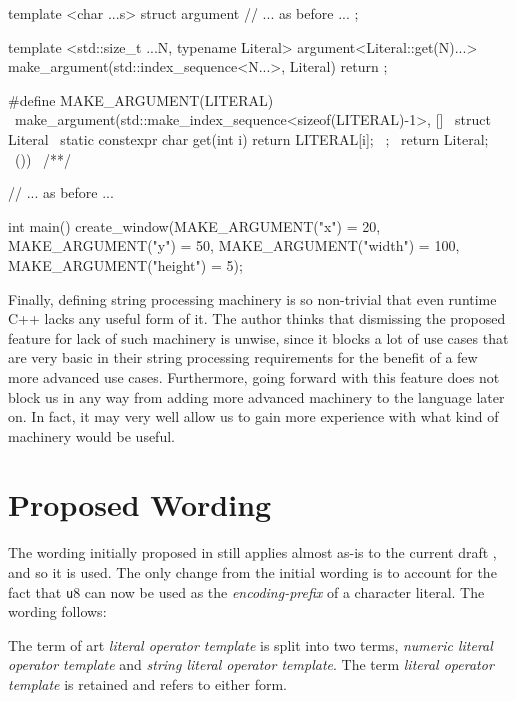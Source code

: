 \documentclass[11pt]{article}
\newcommand{\cc}[1]{\texttt{#1}}
\begin{document}
\begin{cpp}
template <char ...s>
struct argument {
  // ... as before ...
};

template <std::size_t ...N, typename Literal>
argument<Literal::get(N)...> make_argument(std::index_sequence<N...>, Literal) {
  return {};
}

#define MAKE_ARGUMENT(LITERAL)                                              \
  make_argument(std::make_index_sequence<sizeof(LITERAL)-1>{}, []{          \
    struct Literal {                                                        \
      static constexpr char get(int i) { return LITERAL[i]; }               \
    };                                                                      \
    return Literal{};                                                       \
  }())                                                                      \
/**/

// ... as before ...

int main() {
  create_window(MAKE_ARGUMENT("x") = 20, MAKE_ARGUMENT("y") = 50,
                MAKE_ARGUMENT("width") = 100, MAKE_ARGUMENT("height") = 5);
}
\end{cpp}

Finally, defining string processing machinery is so non-trivial that even
runtime C++ lacks any useful form of it. The author thinks that dismissing
the proposed feature for lack of such machinery is unwise, since it blocks
a lot of use cases that are very basic in their string processing requirements
for the benefit of a few more advanced use cases. Furthermore, going forward
with this feature does not block us in any way from adding more advanced
machinery to the language later on. In fact, it may very well allow us to
gain more experience with what kind of machinery would be useful.


\section{Proposed Wording}
The wording initially proposed in \cite{N3599} still applies almost as-is to
the current draft \cite{N4606}, and so it is used. The only change from the
initial wording is to account for the fact that \cc u8 can now be used as the
\textit{encoding-prefix} of a character literal. The wording follows:

The term of art \textit{literal operator template} is split into two terms,
\textit{numeric literal operator template} and \textit{string literal operator
template}. The term \textit{literal operator template} is retained and refers
to either form.
\end{document}
